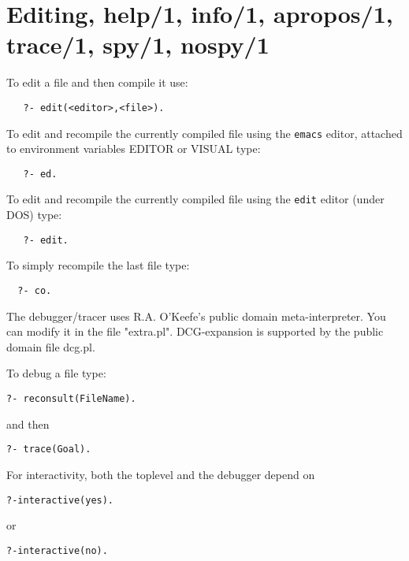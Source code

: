 \documentclass{article}
\begin{document}
\section{Editing, help/1, info/1, apropos/1, trace/1, spy/1, nospy/1}

To edit a file and then compile it use:

\begin{verbatim}
   ?- edit(<editor>,<file>).
\end{verbatim}

To edit and recompile the currently compiled file using the
{\tt emacs} editor, attached to environment variables EDITOR or VISUAL type:

\begin{verbatim}
   ?- ed.
\end{verbatim}

To edit and recompile the currently compiled file using the
{\tt edit} editor (under DOS) type:

\begin{verbatim}
   ?- edit.
\end{verbatim}

To simply recompile the last file type:

\begin{verbatim}
  ?- co.
\end{verbatim}

{\flushleft The debugger/tracer} uses R.A. O'Keefe's public domain
meta-interpreter.  You can modify it in the file "extra.pl".
{\flushleft DCG-expansion} is supported by the public domain file dcg.pl.

To debug a file type:

\begin{verbatim}
?- reconsult(FileName).
\end{verbatim}

{\flushleft and then}

\begin{verbatim}
?- trace(Goal).
\end{verbatim}

{\flushleft For}
 interactivity, both the toplevel and the debugger depend on

\begin{verbatim}
?-interactive(yes).
\end{verbatim}

{\flushleft or}

\begin{verbatim}
?-interactive(no).
\end{verbatim}
\end{document}
